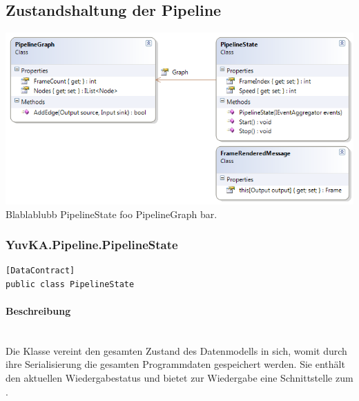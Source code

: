 \subsection{Zustandshaltung der Pipeline}

\includegraphics[width=\textwidth]{YuvKa.Pipeline/states.png}
Blablablubb PipelineState foo PipelineGraph bar.

\subsubsection{YuvKA.Pipeline.PipelineState}

\begin{verbatim}
[DataContract]
public class PipelineState
\end{verbatim}

\paragraph{Beschreibung}~\\
Die Klasse  vereint den gesamten Zustand des Datenmodells in sich, womit durch ihre Serialisierung die gesamten Programmdaten gespeichert werden. Sie enthält den aktuellen Wiedergabestatus und bietet zur Wiedergabe eine Schnittstelle zum .

